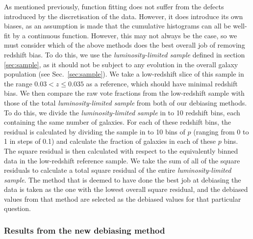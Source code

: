 \documentclass[useAMS,usenatbib]{mn2e}
\begin{document}
As mentioned previously, function fitting does not suffer from the defects introduced by the discretisation of the data. However, it does introduce its own biases, as an assumption is made that the cumulative histograms can all be well-fit by a continuous function. However, this may not always be the case, so we must consider which of the above methods does the best overall job of removing redshift bias. To do this, we use the \textit{luminosity-limited sample} defined in section \ref{sec:sample}, as it should not be subject to any evolution in the overall galaxy population (see Sec.~\ref{sec:sample}). We take a low-redshift slice of this sample in the range $0.03 < z \leq 0.035$ as a reference, which should have minimal redshift bias. We then compare the raw vote fractions from the low-redshift sample with those of the total \textit{luminosity-limited sample} from both of our debiasing methods. To do this, we divide the \textit{luminosity-limited sample} in to 10 redshift bins, each containing the same number of galaxies. For each of these redshift bins, the residual is calculated by dividing the sample in to 10 bins of $p$ (ranging from 0 to 1 in steps of 0.1) and calculate the fraction of galaxies in each of these $p$ bins. The square residual is then calculated with respect to the equivalently binned data in the low-redshift reference sample. We take the sum of all of the square residuals to calculate a total square residual of the entire \textit{luminosity-limited sample}. The method that is deemed to have done the best job at debiasing the data is taken as the one with the lowest overall square residual, and the debiased values from that method are selected as the debiased values for that particular question. 


\subsubsection{Results from the new debiasing method}
\label{sec:debiasing_results}
\end{document}
